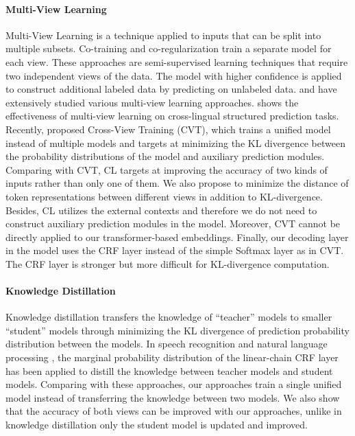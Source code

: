 \documentclass[11pt,a4paper]{article}
\begin{document}
\paragraph{Multi-View Learning}
Multi-View Learning is a technique applied to inputs that can be split into multiple subsets. Co-training \citep{blum1998combining} and co-regularization \citep{sindhwani2005co} train a separate model for each view. These approaches are semi-supervised learning techniques that require two independent views of the data. The model with higher confidence is applied to construct additional labeled data by predicting on unlabeled data. \citet{sun2013survey} and \citet{xu2013survey} have extensively studied various multi-view learning approaches. \citet{hu2021multi} shows the effectiveness of multi-view learning on cross-lingual structured prediction tasks. Recently, \citet{clark-etal-2018-semi} proposed Cross-View Training (CVT), which trains a unified model instead of multiple models and targets at minimizing the KL divergence between the probability distributions of the model and auxiliary prediction modules. Comparing with CVT, CL targets at improving the accuracy of two kinds of inputs rather than only one of them. We also propose to minimize the distance of token representations between different views in addition to KL-divergence. Besides, CL utilizes the external contexts and therefore we do not need to construct auxiliary prediction modules in the model. Moreover, CVT cannot be directly applied to our transformer-based embeddings. Finally, our decoding layer in the model uses the CRF layer instead of the simple Softmax layer as in CVT. The CRF layer is stronger but more difficult for KL-divergence computation.

\paragraph{Knowledge Distillation}
Knowledge distillation \citep{Bucilua:2006:MC:1150402.1150464,44873} transfers the knowledge of ``teacher'' models to smaller ``student'' models through minimizing the KL divergence of prediction probability distribution between the models. In speech recognition \citep{Huang2018} and natural language processing \citep{wang-etal-2020-structure,wang2020structural}, the marginal probability distribution of the linear-chain CRF layer has been applied to distill the knowledge between teacher models and student models. Comparing with these approaches, our approaches train a single unified model instead of transferring the knowledge between two models. We also show that the accuracy of both views can be improved with our approaches, unlike in knowledge distillation only the student model is updated and improved.
\end{document}
